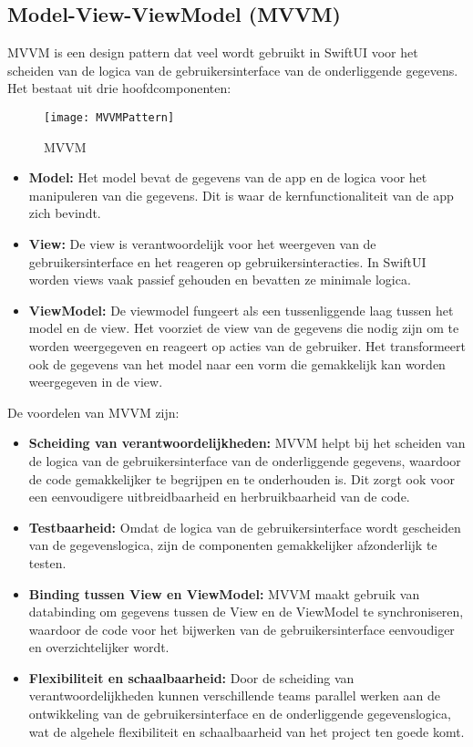 \subsection{Model-View-ViewModel (MVVM)}
\autocite{MediumMVVM} MVVM is een design pattern dat veel wordt gebruikt in SwiftUI voor het scheiden van de logica van de gebruikersinterface van de onderliggende gegevens. Het bestaat uit drie hoofdcomponenten:
\begin{figure}[H]
    \centering
    \texttt{[image: MVVMPattern]} 
    \caption{MVVM}
    \label{fig:mvvm}
\end{figure}
\begin{itemize}
    \item {\textbf{Model:} Het model bevat de gegevens van de app en de logica voor het manipuleren van die gegevens. Dit is waar de kernfunctionaliteit van de app zich bevindt.}
    \item {\textbf{View:} De view is verantwoordelijk voor het weergeven van de gebruikersinterface en het reageren op gebruikersinteracties. In SwiftUI worden views vaak passief gehouden en bevatten ze minimale logica.}
    \item {\textbf{ViewModel:} De viewmodel fungeert als een tussenliggende laag tussen het model en de view. Het voorziet de view van de gegevens die nodig zijn om te worden weergegeven en reageert op acties van de gebruiker. Het transformeert ook de gegevens van het model naar een vorm die gemakkelijk kan worden weergegeven in de view.}
\end{itemize}
De voordelen van MVVM zijn:
\begin{itemize}
    \item {\textbf{Scheiding van verantwoordelijkheden:} MVVM helpt bij het scheiden van de logica van de gebruikersinterface van de onderliggende gegevens, waardoor de code gemakkelijker te begrijpen en te onderhouden is. Dit zorgt ook voor een eenvoudigere uitbreidbaarheid en herbruikbaarheid van de code.}
    \item {\textbf{Testbaarheid:} Omdat de logica van de gebruikersinterface wordt gescheiden van de gegevenslogica, zijn de componenten gemakkelijker afzonderlijk te testen.}
        \item \textbf{Binding tussen View en ViewModel:} MVVM maakt gebruik van databinding om gegevens tussen de View en de ViewModel te synchroniseren, waardoor de code voor het bijwerken van de gebruikersinterface eenvoudiger en overzichtelijker wordt.
    
    \item \textbf{Flexibiliteit en schaalbaarheid:} Door de scheiding van verantwoordelijkheden kunnen verschillende teams parallel werken aan de ontwikkeling van de gebruikersinterface en de onderliggende gegevenslogica, wat de algehele flexibiliteit en schaalbaarheid van het project ten goede komt.
\end{itemize}

